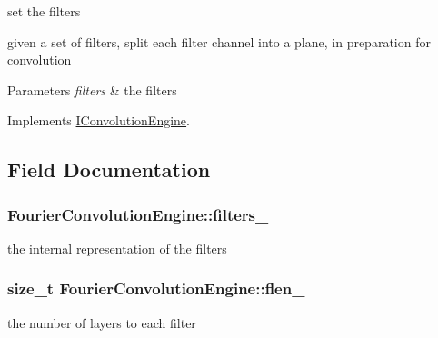 set the filters 

given a set of filters, split each filter channel into a plane, in preparation for convolution


\begin{DoxyParams}{Parameters}
{\em filters} & the filters \\
\hline
\end{DoxyParams}


Implements \hyperlink{classIConvolutionEngine_a3570aae351b5fcb93bcd87a06c65ea0a}{I\+Convolution\+Engine}.



\subsection{Field Documentation}
\hypertarget{classFourierConvolutionEngine_ac6cf3c6a66e99bec7d8135f8069d79e3}{}
\subsubsection[{filters\+\_\+}]{ Fourier\+Convolution\+Engine\+::filters\+\_\+\hspace{0.3cm}{\ttfamily [private]}}\label{classFourierConvolutionEngine_ac6cf3c6a66e99bec7d8135f8069d79e3}


the internal representation of the filters 

\hypertarget{classFourierConvolutionEngine_ab4322f51ce4a18ab5b7439abb5c96aef}{}
\subsubsection[{flen\+\_\+}]{\setlength{\rightskip}{0pt plus 5cm}size\+\_\+t Fourier\+Convolution\+Engine\+::flen\+\_\+\hspace{0.3cm}{\ttfamily [private]}}\label{classFourierConvolutionEngine_ab4322f51ce4a18ab5b7439abb5c96aef}


the number of layers to each filter 

\hypertarget{classFourierConvolutionEngine_a2375ea1729ad2fe45fe6204130f3f39f}{}
